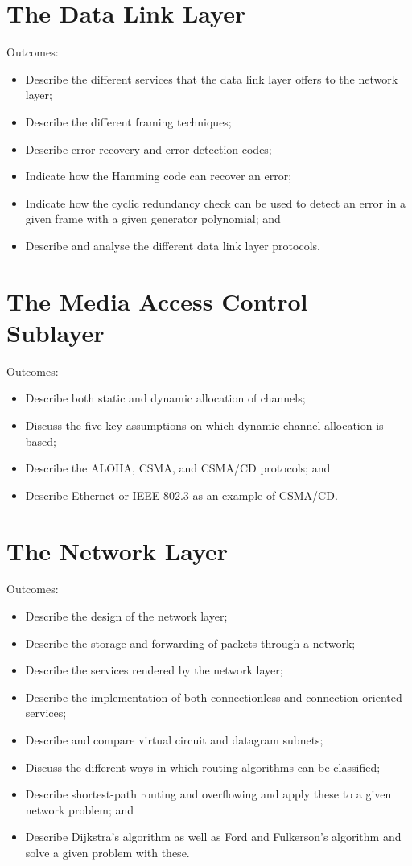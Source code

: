 \documentclass[a4paper, 12pt, titlepage]{report}
\begin{document}
\chapter{The Data Link Layer}
Outcomes:
\begin{itemize}
\item Describe the different services that the data link layer offers to the network layer;
\item Describe the different framing techniques;
\item Describe error recovery and error detection codes;
\item Indicate how the Hamming code can recover an error;
\item Indicate how the cyclic redundancy check can be used to detect an error in a given frame with a given generator polynomial; and
\item Describe and analyse the different data link layer protocols.
\end{itemize}
\chapter{The Media Access Control Sublayer}
Outcomes:
\begin{itemize}
\item Describe both static and dynamic allocation of channels;
\item Discuss the five key assumptions on which dynamic channel allocation is based;
\item Describe the ALOHA, CSMA, and CSMA/CD protocols; and
\item Describe Ethernet or IEEE 802.3 as an example of CSMA/CD.
\end{itemize}
\chapter{The Network Layer}
Outcomes:
\begin{itemize}
\item Describe the design of the network layer;
\item Describe the storage and forwarding of packets through a network;
\item Describe the services rendered by the network layer;
\item Describe the implementation of both connectionless and connection-oriented services;
\item Describe and compare virtual circuit and datagram subnets;
\item Discuss the different ways in which routing algorithms can be classified;
\item Describe shortest-path routing and overflowing and apply these to a given network problem; and
\item Describe Dijkstra’s algorithm as well as Ford and Fulkerson’s algorithm and solve a given problem with these.
\end{itemize}
\end{document}
